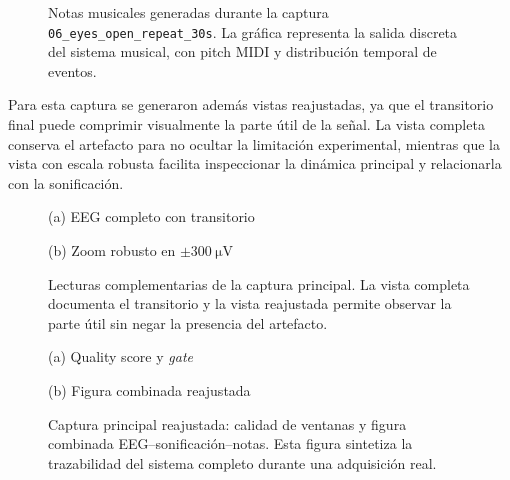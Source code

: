 \documentclass[../main.tex]{subfiles}
\begin{document}
\begin{figure}[htbp]
    \centering
    \caption{Notas musicales generadas durante la captura \texttt{06\_eyes\_open\_repeat\_30s}. La gráfica representa la salida discreta del sistema musical, con pitch MIDI y distribución temporal de eventos.}
    \label{fig:validacion_s01_06_notes}
\end{figure}

Para esta captura se generaron además vistas reajustadas, ya que el transitorio final puede comprimir visualmente la parte útil de la señal. La vista completa conserva el artefacto para no ocultar la limitación experimental, mientras que la vista con escala robusta facilita inspeccionar la dinámica principal y relacionarla con la sonificación.

\begin{figure}[htbp]
    \centering
    \begin{minipage}{0.49\textwidth}
        \centering
        \small (a) EEG completo con transitorio
    \end{minipage}
    \hfill
    \begin{minipage}{0.49\textwidth}
        \centering
        \small (b) Zoom robusto en \(\pm\SI{300}{\micro\volt}\)
    \end{minipage}
    \caption{Lecturas complementarias de la captura principal. La vista completa documenta el transitorio y la vista reajustada permite observar la parte útil sin negar la presencia del artefacto.}
    \label{fig:validacion_s01_06_eeg_completo_zoom}
\end{figure}

\begin{figure}[htbp]
    \centering
    \begin{minipage}{0.49\textwidth}
        \centering
        \small (a) Quality score y \textit{gate}
    \end{minipage}
    \hfill
    \begin{minipage}{0.49\textwidth}
        \centering
        \small (b) Figura combinada reajustada
    \end{minipage}
    \caption{Captura principal reajustada: calidad de ventanas y figura combinada EEG--sonificación--notas. Esta figura sintetiza la trazabilidad del sistema completo durante una adquisición real.}
    \label{fig:validacion_s01_06_reajustada}
\end{figure}
\end{document}
